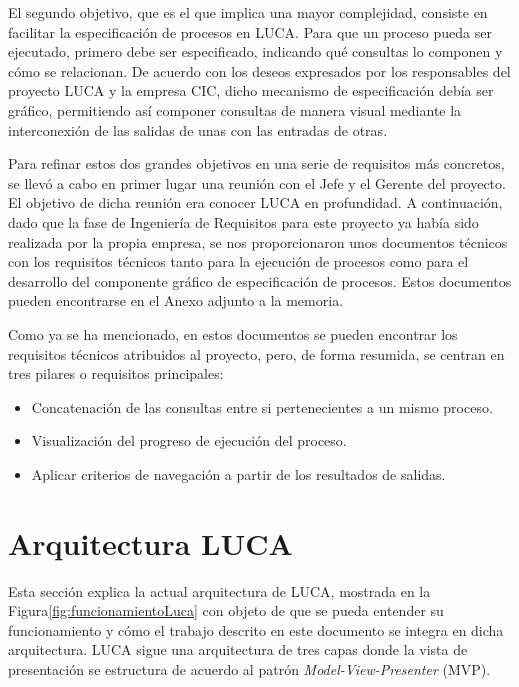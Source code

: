 El segundo objetivo, que es el que implica una mayor complejidad, consiste en facilitar la especificación de procesos en LUCA. Para que un proceso pueda ser ejecutado, primero debe ser especificado, indicando qué consultas lo componen y cómo se relacionan. De acuerdo con los deseos expresados por los responsables del proyecto LUCA y la empresa CIC, dicho mecanismo de especificación debía ser gráfico, permitiendo así componer consultas de manera visual mediante la interconexión de las salidas de unas con las entradas de otras.

Para refinar estos dos grandes objetivos en una serie de requisitos más concretos, se llevó a cabo en primer lugar una reunión con el Jefe y el Gerente del proyecto. El objetivo de dicha reunión era conocer LUCA en profundidad. A continuación, dado que la fase de Ingeniería de Requisitos para este proyecto ya había sido realizada por la propia empresa, se nos proporcionaron unos documentos técnicos con los requisitos técnicos tanto para la ejecución de procesos como para el desarrollo del componente gráfico de especificación de procesos. Estos documentos pueden encontrarse en el Anexo adjunto a la memoria.


Como ya se ha mencionado, en estos documentos se pueden encontrar los requisitos técnicos atribuidos al proyecto, pero, de forma resumida, se centran en tres pilares o requisitos principales:



\begin{itemize}
	\item Concatenación de las consultas entre si pertenecientes a un mismo proceso.
	\item Visualización del progreso de ejecución del proceso.
	\item Aplicar criterios de navegación a partir de los resultados de salidas.
\end{itemize}


\section{Arquitectura LUCA}


Esta sección explica la actual arquitectura de LUCA, mostrada en la Figura\ref{fig:funcionamientoLuca} con objeto de que se pueda entender su funcionamiento y cómo el trabajo descrito en este documento se integra en dicha arquitectura. LUCA sigue una arquitectura de tres capas donde la vista de presentación se estructura de acuerdo al patrón \emph{Model-View-Presenter} (MVP).



